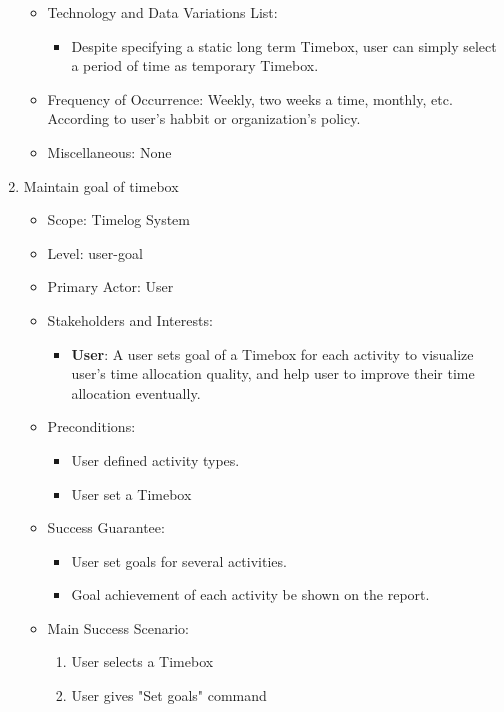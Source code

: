 \documentclass[12pt, a4paper]{article}
\begin{document}
\begin{CJK*}{UTF8}{bkai}
\begin{enumerate}
\begin{itemize}
          \item Technology and Data Variations List:
            \begin{itemize}
              \item Despite specifying a static long term Timebox, user can simply select a period of time as temporary Timebox.
            \end{itemize}
          \item Frequency of Occurrence: Weekly, two weeks a time, monthly, etc. According to user's habbit or organization's policy.
          \item Miscellaneous: None
        \end{itemize}
      \item Maintain goal of timebox
        \begin{itemize}
          \item Scope: Timelog System
          \item Level: user-goal
          \item Primary Actor: User
          \item Stakeholders and Interests:
            \begin{itemize}
              \item {\bf User}: A user sets goal of a Timebox for each activity to visualize user's time allocation quality, and help user to improve their time allocation eventually.
            \end{itemize}
          \item Preconditions:
            \begin{itemize}
              \item User defined activity types.
              \item User set a Timebox
            \end{itemize}
          \item Success Guarantee:
            \begin{itemize}
              \item User set goals for several activities.
              \item Goal achievement of each activity be shown on the report.
            \end{itemize}
          \item Main Success Scenario:
            \begin{enumerate}
              \item User selects a Timebox
              \item User gives "Set goals" command

\end{enumerate}
\end{itemize}
\end{enumerate}
\end{CJK*}
\end{document}
